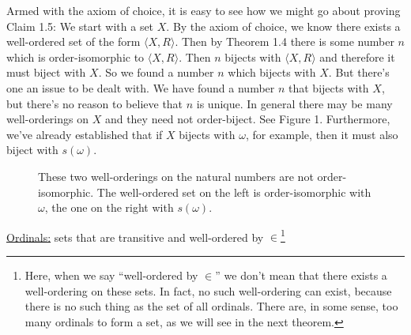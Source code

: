 \documentclass[english,course]{Notes}
\begin{document}
Armed with the axiom of choice, it is easy to see how we might go about 
proving Claim 1.5: We start with a set $X$. By the axiom of choice, we know 
there exists a well-ordered set of the form $\langle X, R \rangle$. Then by 
Theorem 1.4 there is some number $n$ which is order-isomorphic to $\langle X, R 
\rangle$. Then $n$ bijects with $\langle X, R \rangle$ and therefore it must 
biject with $X$. So we found a number $n$ which bijects with $X$. But there's one 
an issue to be dealt with. We have found a number $n$ that bijects with $X$, but there's no reason to 
believe that $n$ is unique. In general there may be many well-orderings on $X$ 
and they need not order-biject. See Figure 1. 
Furthermore, we've already established that if $X$ bijects with $\omega$, for 
example, then it must also biject with $s(\omega)$.   

\medskip

\begin{figure}
\hspace{2cm}
\caption{These two well-orderings on the natural numbers  
are not order-isomorphic. The well-ordered 
set on the left is order-isomorphic with $\omega$, the one on the right with $s(\omega)$.} 
\end{figure}

\medskip

\noindent \underline{Ordinals:} sets that are transitive and well-ordered by 
$\in$\footnote{Here, when we say ``well-ordered by $\in$'' we don't mean that 
there exists a well-ordering on these sets. In fact, no such well-ordering can 
exist, because there is no such thing as the set of all ordinals. There are, in 
some sense, too many ordinals to form a set, as we will see in the next theorem.} 
\end{document}
